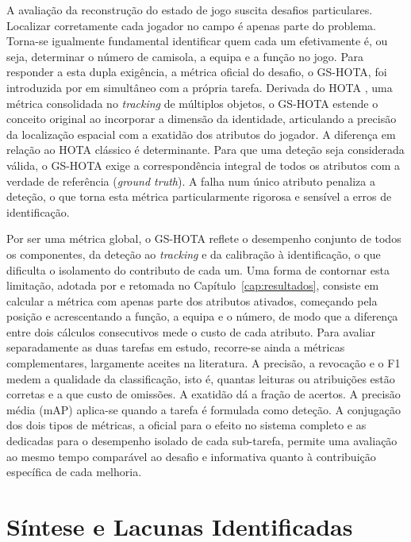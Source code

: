 A avaliação da reconstrução do estado de jogo suscita desafios particulares. Localizar corretamente cada jogador no campo é apenas parte do problema. Torna-se igualmente fundamental identificar quem cada um efetivamente é, ou seja, determinar o número de camisola, a equipa e a função no jogo. Para responder a esta dupla exigência, a métrica oficial do desafio, o GS-HOTA, foi introduzida por \citet{somers2024soccernet} em simultâneo com a própria tarefa. Derivada do HOTA \citep{luiten2021hota}, uma métrica consolidada no \emph{tracking} de múltiplos objetos, o GS-HOTA estende o conceito original ao incorporar a dimensão da identidade, articulando a precisão da localização espacial com a exatidão dos atributos do jogador. A diferença em relação ao HOTA clássico é determinante. Para que uma deteção seja considerada válida, o GS-HOTA exige a correspondência integral de todos os atributos com a verdade de referência (\emph{ground truth}). A falha num único atributo penaliza a deteção, o que torna esta métrica particularmente rigorosa e sensível a erros de identificação.

Por ser uma métrica global, o GS-HOTA reflete o desempenho conjunto de todos os componentes, da deteção ao \emph{tracking} e da calibração à identificação, o que dificulta o isolamento do contributo de cada um. Uma forma de contornar esta limitação, adotada por \citet{oo2026broadcast2pitch} e retomada no Capítulo~\ref{cap:resultados}, consiste em calcular a métrica com apenas parte dos atributos ativados, começando pela posição e acrescentando a função, a equipa e o número, de modo que a diferença entre dois cálculos consecutivos mede o custo de cada atributo. Para avaliar separadamente as duas tarefas em estudo, recorre-se ainda a métricas complementares, largamente aceites na literatura. A precisão, a revocação e o F1 medem a qualidade da classificação, isto é, quantas leituras ou atribuições estão corretas e a que custo de omissões. A exatidão dá a fração de acertos. A precisão média (mAP) aplica-se quando a tarefa é formulada como deteção. A conjugação dos dois tipos de métricas, a oficial para o efeito no sistema completo e as dedicadas para o desempenho isolado de cada sub-tarefa, permite uma avaliação ao mesmo tempo comparável ao desafio e informativa quanto à contribuição específica de cada melhoria.

\section{Síntese e Lacunas Identificadas}

